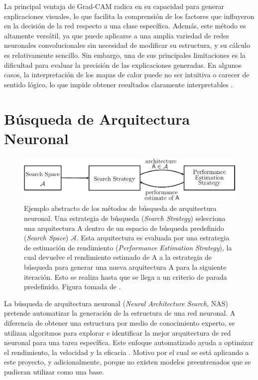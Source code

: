 La principal ventaja de Grad-CAM radica en su capacidad para generar explicaciones visuales, lo que facilita la comprensión de los factores que influyeron en la decisión de la red respecto a una clase específica. Además, este método es altamente versátil, ya que puede aplicarse a una amplia variedad de redes neuronales convolucionales sin necesidad de modificar su estructura, y su cálculo es relativamente sencillo. Sin embargo, una de sus principales limitaciones es la dificultad para evaluar la precisión de las explicaciones generadas. En algunos casos, la interpretación de los mapas de calor puede no ser intuitiva o carecer de sentido lógico, lo que impide obtener resultados claramente interpretables \cite{molnar2025}.

\FloatBarrier

\section{Búsqueda de Arquitectura Neuronal}
\label{section2:nas}

\begin{figure}[h]
    \centering
    \includegraphics[width=0.8\linewidth]{figures/2_theory/nas_example.pdf}
    \caption[Ejemplo abstracto de los métodos de búsqueda de arquitectura neuronal]{Ejemplo abstracto de los métodos de búsqueda de arquitectura neuronal. Una estrategia de búsqueda (\textit{Search Strategy}) selecciona una arquitectura A dentro de un espacio de búsqueda predefinido (\textit{Search Space}) $\mathcal{A}$. Esta arquitectura es evaluada por una estrategia de estimación de rendimiento (\textit{Performance Estimation Strategy}), la cual devuelve el rendimiento estimado de A a la estrategia de búsqueda para generar una nueva arquitectura A para la siguiente iteración. Esto se realiza hasta que se llega a un criterio de parada predefinido. Figura tomada de \cite{elsken_neural_2018}.}

    \label{nas_example}
\end{figure}

La búsqueda de arquitectura neuronal (\textit{Neural Architecture Search}, NAS) \cite{zoph_neural_2017} pretende automatizar la generación de la estructura de una red neuronal. A diferencia de obtener una estructura por medio de conocimiento experto, se utilizan algoritmos para explorar e identificar la mejor arquitectura de red neuronal para una tarea específica. Este enfoque automatizado ayuda a optimizar el rendimiento, la velocidad y la eficacia \cite{ultralytics_busqueda_nas}. Motivo por el cual se está aplicando a este proyecto, y adicionalmente, porque no existen modelos preentrenados que se pudieran utilizar como una base.


